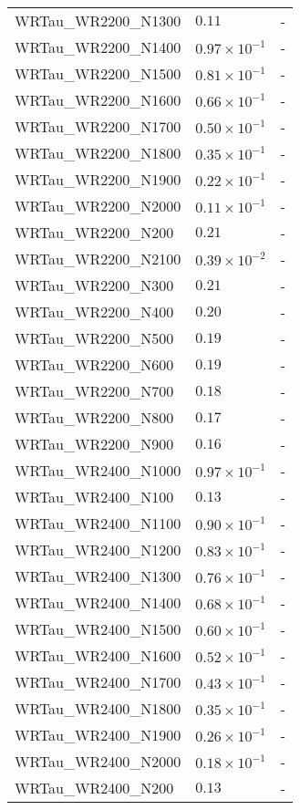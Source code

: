 \begin{longtable}[c]{| C{.35\textwidth} | C{.15\textwidth} | C{.1\textwidth}|}
    WRTau\_WR2200\_N1300 & $0.11$ & - \\
    WRTau\_WR2200\_N1400 & $0.97\times10^{-1}$ & - \\
    WRTau\_WR2200\_N1500 & $0.81\times10^{-1}$ & - \\
    WRTau\_WR2200\_N1600 & $0.66\times10^{-1}$ & - \\
    WRTau\_WR2200\_N1700 & $0.50\times10^{-1}$ & - \\
    WRTau\_WR2200\_N1800 & $0.35\times10^{-1}$ & - \\
    WRTau\_WR2200\_N1900 & $0.22\times10^{-1}$ & - \\
    WRTau\_WR2200\_N2000 & $0.11\times10^{-1}$ & - \\
    WRTau\_WR2200\_N200 & $0.21$ & - \\
    WRTau\_WR2200\_N2100 & $0.39\times10^{-2}$ & - \\
    WRTau\_WR2200\_N300 & $0.21$ & - \\
    WRTau\_WR2200\_N400 & $0.20$ & - \\
    WRTau\_WR2200\_N500 & $0.19$ & - \\
    WRTau\_WR2200\_N600 & $0.19$ & - \\
    WRTau\_WR2200\_N700 & $0.18$ & - \\
    WRTau\_WR2200\_N800 & $0.17$ & - \\
    WRTau\_WR2200\_N900 & $0.16$ & - \\ \hline
    WRTau\_WR2400\_N1000 & $0.97\times10^{-1}$ & - \\
    WRTau\_WR2400\_N100 & $0.13$ & - \\
    WRTau\_WR2400\_N1100 & $0.90\times10^{-1}$ & - \\
    WRTau\_WR2400\_N1200 & $0.83\times10^{-1}$ & - \\
    WRTau\_WR2400\_N1300 & $0.76\times10^{-1}$ & - \\
    WRTau\_WR2400\_N1400 & $0.68\times10^{-1}$ & - \\
    WRTau\_WR2400\_N1500 & $0.60\times10^{-1}$ & - \\
    WRTau\_WR2400\_N1600 & $0.52\times10^{-1}$ & - \\
    WRTau\_WR2400\_N1700 & $0.43\times10^{-1}$ & - \\
    WRTau\_WR2400\_N1800 & $0.35\times10^{-1}$ & - \\
    WRTau\_WR2400\_N1900 & $0.26\times10^{-1}$ & - \\
    WRTau\_WR2400\_N2000 & $0.18\times10^{-1}$ & - \\
    WRTau\_WR2400\_N200 & $0.13$ & - \\

\end{longtable}

